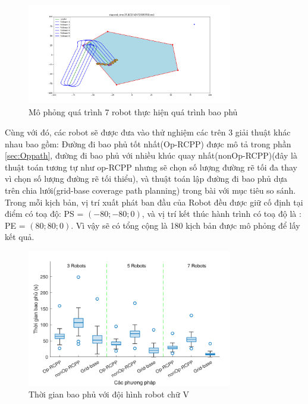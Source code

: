 \begin{figure}[H]
    \centering
    \includegraphics[width=0.8\textwidth]{chapter5/image/7robot.png}
    \caption{Mô phỏng quá trình 7 robot thực hiện quá trình bao phủ}
    \label{fig:7r}
\end{figure}

Cùng với đó, các robot sẽ được đưa vào thử nghiệm các trên 3 giải thuật khác nhau bao gồm: Đường đi bao phủ tốt nhất(Op-RCPP) được mô tả trong phần \ref{sec:Oppath}, đường đi bao phủ với nhiều khúc quay nhất(nonOp-RCPP)(đây là thuật toán tương tự như op-RCPP nhưng sẽ chọn số lượng đường rẽ tối đa thay vì chọn số lượng đường rẽ tối thiểu), và thuật toán lập đường đi bao phủ dựa trên chia lưới(grid-base coverage path planning) trong bài \cite{nam2016approach} với mục tiêu so sánh. Trong mỗi kịch bản, vị trí xuất phát ban đầu của Robot đều được giữ cố định tại điểm có toạ độ: PS = $(-80;-80;0)$, và vị trí kết thúc hành trình có toạ độ là : PE = $(80;80;0)$. Vì vậy sẽ có tổng cộng là 180 kịch bản được mô phỏng để lấy kết quả.

\begin{figure}[h!]
    \centering
    \includegraphics[width=0.8\textwidth]{chapter5/image/CoverageTime.pdf}
    \caption{Thời gian bao phủ với đội hình robot chữ V}
    \label{fig:cov}
\end{figure}

